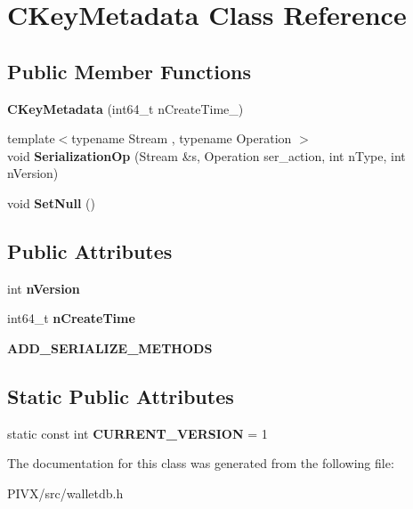 \hypertarget{class_c_key_metadata}{}\section{C\+Key\+Metadata Class Reference}
\label{class_c_key_metadata}
\subsection*{Public Member Functions}
\begin{DoxyCompactItemize}
\item 
\mbox{\label{class_c_key_metadata_accabc99065b0dbdd8862b4338266893f}} 
{\bfseries C\+Key\+Metadata} (int64\+\_\+t n\+Create\+Time\+\_\+)
\item 
\mbox{\label{class_c_key_metadata_aeba08a154d4b3f6ddac96c25b852d342}} 
{\footnotesize template$<$typename Stream , typename Operation $>$ }\\void {\bfseries Serialization\+Op} (Stream \&s, Operation ser\+\_\+action, int n\+Type, int n\+Version)
\item 
\mbox{\label{class_c_key_metadata_ab78641eb092af623a363b5c403c06a1f}} 
void {\bfseries Set\+Null} ()
\end{DoxyCompactItemize}
\subsection*{Public Attributes}
\begin{DoxyCompactItemize}
\item 
\mbox{\label{class_c_key_metadata_a52f63ceb60b53e491666b6aa59a4d818}} 
int {\bfseries n\+Version}
\item 
\mbox{\label{class_c_key_metadata_accfd31222aefcbdcba1fb0214e546e6d}} 
int64\+\_\+t {\bfseries n\+Create\+Time}
\item 
\mbox{\label{class_c_key_metadata_a7e1f57544d6d63342bddeee5a08aba1a}} 
{\bfseries A\+D\+D\+\_\+\+S\+E\+R\+I\+A\+L\+I\+Z\+E\+\_\+\+M\+E\+T\+H\+O\+DS}
\end{DoxyCompactItemize}
\subsection*{Static Public Attributes}
\begin{DoxyCompactItemize}
\item 
\mbox{\label{class_c_key_metadata_a805f9472960eec81031596ce1133e629}} 
static const int {\bfseries C\+U\+R\+R\+E\+N\+T\+\_\+\+V\+E\+R\+S\+I\+ON} = 1
\end{DoxyCompactItemize}


The documentation for this class was generated from the following file\+:\begin{DoxyCompactItemize}
\item 
P\+I\+V\+X/src/walletdb.\+h\end{DoxyCompactItemize}
